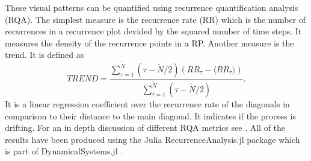 \documentclass{article}
\begin{document}
These visual patterns can be quantified using recurrence quantification analysis (RQA)\cite{Zbilut}.
The simplest measure is the recurrence rate (RR) which is the number of recurrences in a recurrence plot devided by the squared number of time steps.
It measures the density of the recurrence points in a RP.
Another measure is the trend.
It is defined as
$$ TREND= \frac{\sum_{\tau=1}^{\tilde{N}}(\tau - \tilde{N}/2)(RR_\tau - \langle RR_\tau \rangle)}{\sum_{\tau=1}^{\tilde{N}}(\tau - \tilde{N}/2)}.$$
It is a linear regression coefficient over the recurrence rate of the diagonals in comparison to their distance to the main diagonal.
It indicates if the process is drifting.
For an in depth discussion of different RQA metrics see \cite{Marwan06}.
All of the results have been produced using the Julia \mbox{RecurrenceAnalysis.jl} package which is part of DynamicalSystems.jl \cite{DynamicalSystems.jl-2018}.
\end{document}
